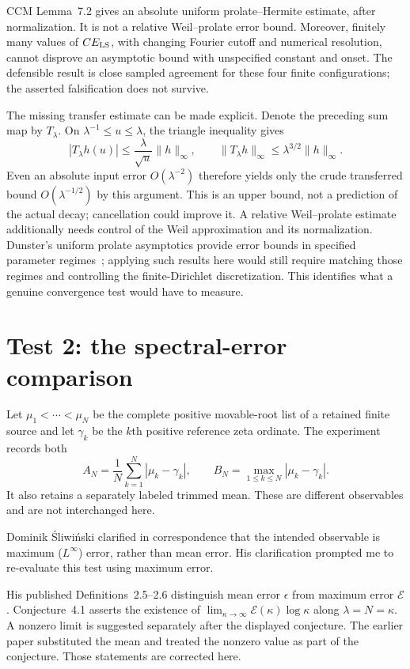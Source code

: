 \documentclass[11pt,a4paper]{article}
\begin{document}
CCM Lemma~7.2 gives an absolute uniform prolate--Hermite estimate,
after normalization. It is not a relative Weil--prolate error bound.
Moreover, finitely many values of $C E_{\rm LS}$, with changing
Fourier cutoff and numerical resolution, cannot disprove an
asymptotic bound with unspecified constant and onset. The defensible
result is close sampled agreement for these four finite configurations;
the asserted falsification does not survive.

The missing transfer estimate can be made explicit. Denote the preceding
sum map by $T_\lambda$. On $\lambda^{-1}\leq u\leq\lambda$, the triangle
inequality gives
\begin{equation}
 |T_\lambda h(u)|\leq\frac{\lambda}{\sqrt u}\|h\|_\infty,
 \qquad \|T_\lambda h\|_\infty\leq\lambda^{3/2}\|h\|_\infty.
 \label{eq:prolate-transfer}
\end{equation}
Even an absolute input error $O(\lambda^{-2})$ therefore yields only
the crude transferred bound $O(\lambda^{-1/2})$ by this argument.
This is an upper bound, not a prediction of the actual decay; cancellation
could improve it. A relative Weil--prolate estimate additionally needs
control of the Weil approximation and its normalization. Dunster's
uniform prolate asymptotics provide error bounds in specified parameter
regimes~\cite{Dunster2017}; applying such results here would still require
matching those regimes and controlling the finite-Dirichlet discretization.
This identifies what a genuine convergence test would have to measure.

\section{Test 2: the spectral-error comparison}
\label{sec:roots}

Let $\mu_1<\cdots<\mu_N$ be the complete positive movable-root list
of a retained finite source and let $\gamma_k$ be the $k$th positive
reference zeta ordinate. The experiment records both
\[
 A_N=\frac1N\sum_{k=1}^N|\mu_k-\gamma_k|,
 \qquad B_N=\max_{1\leq k\leq N}|\mu_k-\gamma_k|.
\]
It also retains a separately labeled trimmed mean. These are different
observables and are not interchanged here.

Dominik \'Sliwi\'nski clarified in correspondence that the intended
observable is maximum ($L^\infty$) error, rather than mean error.
His clarification prompted me to re-evaluate this test using maximum error.

His published Definitions~2.5--2.6 distinguish mean error $\epsilon$ from maximum error
$\mathcal E$. Conjecture~4.1 asserts the
existence of $\lim_{\kappa\to\infty}\mathcal E(\kappa)\log\kappa$
along $\lambda=N=\kappa$. A nonzero limit is suggested separately
after the displayed conjecture. The earlier paper substituted the
mean and treated the nonzero value as part of the conjecture.
Those statements are corrected here.
\end{document}
